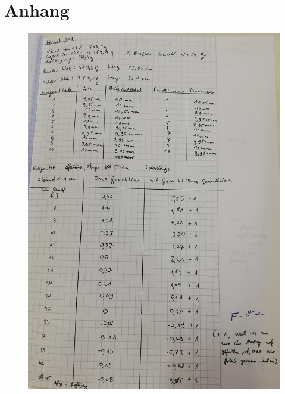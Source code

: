 \section{Anhang}

\begin{figure}[H]
  \centering
  \includegraphics[width=15cm]{content/A1.jpg}
\end{figure}


